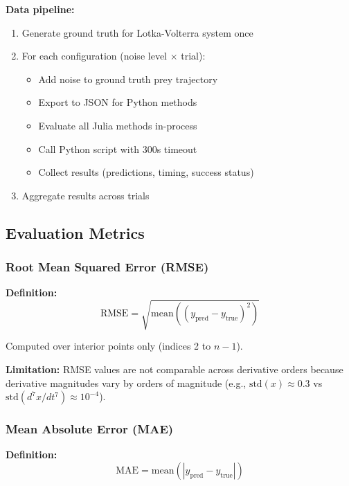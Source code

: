 \textbf{Data pipeline:}
\begin{enumerate}
    \item Generate ground truth for Lotka-Volterra system once
    \item For each configuration (noise level $\times$ trial):
    \begin{itemize}
        \item Add noise to ground truth prey trajectory
        \item Export to JSON for Python methods
        \item Evaluate all Julia methods in-process
        \item Call Python script with 300s timeout
        \item Collect results (predictions, timing, success status)
    \end{itemize}
    \item Aggregate results across trials
\end{enumerate}

\subsection{Evaluation Metrics}
\label{sec:metrics}

\subsubsection{Root Mean Squared Error (RMSE)}

\textbf{Definition:}
\begin{equation}
\text{RMSE} = \sqrt{\text{mean}((y_{\text{pred}} - y_{\text{true}})^2)}
\end{equation}

Computed over interior points only (indices 2 to $n-1$).

\textbf{Limitation:} RMSE values are not comparable across derivative orders because derivative magnitudes vary by orders of magnitude (e.g., $\text{std}(x) \approx 0.3$ vs $\text{std}(d^7x/dt^7) \approx 10^{-4}$).

\subsubsection{Mean Absolute Error (MAE)}

\textbf{Definition:}
\begin{equation}
\text{MAE} = \text{mean}(|y_{\text{pred}} - y_{\text{true}}|)
\end{equation}

